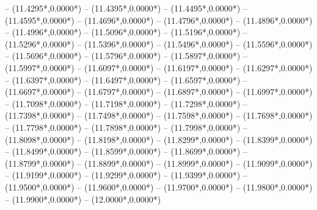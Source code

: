 {	-- ({11.4295*\dx},{0.0000*\dy})
	-- ({11.4395*\dx},{0.0000*\dy})
	-- ({11.4495*\dx},{0.0000*\dy})
	-- ({11.4595*\dx},{0.0000*\dy})
	-- ({11.4696*\dx},{0.0000*\dy})
	-- ({11.4796*\dx},{0.0000*\dy})
	-- ({11.4896*\dx},{0.0000*\dy})
	-- ({11.4996*\dx},{0.0000*\dy})
	-- ({11.5096*\dx},{0.0000*\dy})
	-- ({11.5196*\dx},{0.0000*\dy})
	-- ({11.5296*\dx},{0.0000*\dy})
	-- ({11.5396*\dx},{0.0000*\dy})
	-- ({11.5496*\dx},{0.0000*\dy})
	-- ({11.5596*\dx},{0.0000*\dy})
	-- ({11.5696*\dx},{0.0000*\dy})
	-- ({11.5796*\dx},{0.0000*\dy})
	-- ({11.5897*\dx},{0.0000*\dy})
	-- ({11.5997*\dx},{0.0000*\dy})
	-- ({11.6097*\dx},{0.0000*\dy})
	-- ({11.6197*\dx},{0.0000*\dy})
	-- ({11.6297*\dx},{0.0000*\dy})
	-- ({11.6397*\dx},{0.0000*\dy})
	-- ({11.6497*\dx},{0.0000*\dy})
	-- ({11.6597*\dx},{0.0000*\dy})
	-- ({11.6697*\dx},{0.0000*\dy})
	-- ({11.6797*\dx},{0.0000*\dy})
	-- ({11.6897*\dx},{0.0000*\dy})
	-- ({11.6997*\dx},{0.0000*\dy})
	-- ({11.7098*\dx},{0.0000*\dy})
	-- ({11.7198*\dx},{0.0000*\dy})
	-- ({11.7298*\dx},{0.0000*\dy})
	-- ({11.7398*\dx},{0.0000*\dy})
	-- ({11.7498*\dx},{0.0000*\dy})
	-- ({11.7598*\dx},{0.0000*\dy})
	-- ({11.7698*\dx},{0.0000*\dy})
	-- ({11.7798*\dx},{0.0000*\dy})
	-- ({11.7898*\dx},{0.0000*\dy})
	-- ({11.7998*\dx},{0.0000*\dy})
	-- ({11.8098*\dx},{0.0000*\dy})
	-- ({11.8198*\dx},{0.0000*\dy})
	-- ({11.8299*\dx},{0.0000*\dy})
	-- ({11.8399*\dx},{0.0000*\dy})
	-- ({11.8499*\dx},{0.0000*\dy})
	-- ({11.8599*\dx},{0.0000*\dy})
	-- ({11.8699*\dx},{0.0000*\dy})
	-- ({11.8799*\dx},{0.0000*\dy})
	-- ({11.8899*\dx},{0.0000*\dy})
	-- ({11.8999*\dx},{0.0000*\dy})
	-- ({11.9099*\dx},{0.0000*\dy})
	-- ({11.9199*\dx},{0.0000*\dy})
	-- ({11.9299*\dx},{0.0000*\dy})
	-- ({11.9399*\dx},{0.0000*\dy})
	-- ({11.9500*\dx},{0.0000*\dy})
	-- ({11.9600*\dx},{0.0000*\dy})
	-- ({11.9700*\dx},{0.0000*\dy})
	-- ({11.9800*\dx},{0.0000*\dy})
	-- ({11.9900*\dx},{0.0000*\dy})
	-- ({12.0000*\dx},{0.0000*\dy})
}

